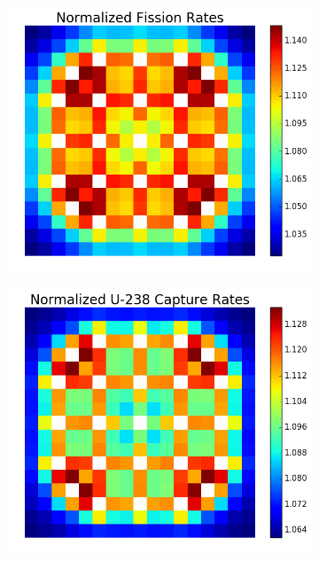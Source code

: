 \begin{figure}[h!]
\centering
\begin{subfigure}{0.45\textwidth}
  \includegraphics[width=\linewidth]{figures/assembly/fission-rates}
  \caption{}
  \label{fig:fiss-assm}
\end{subfigure}%
\begin{subfigure}{0.45\textwidth}
  \includegraphics[width=\linewidth]{figures/assembly/capture-rates}
  \caption{}
  \label{fig:capt-assm}

\end{subfigure}
\end{figure}
